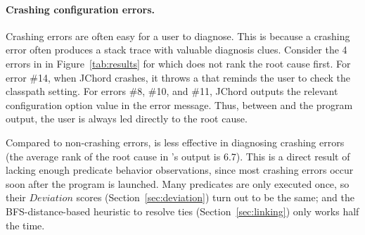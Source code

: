 
\paragraph{Crashing configuration errors.}

Crashing errors are often easy for a user to diagnose.
This is because a crashing error often produces a stack trace with valuable diagnosis clues.
Consider the 4 errors in in Figure~\ref{tab:results} for which \ourtool
does not rank the root cause first.
For error \#14, when JChord crashes, it throws a 
that reminds the user to check the classpath setting.  For errors \#8,
\#10, and \#11, 
JChord outputs the relevant configuration option value in the
error message.  Thus, between \ourtool and the program output, the user is
always led directly to the root cause.

Compared to non-crashing errors, \ourtool is less effective
in diagnosing crashing errors (the average rank of the root cause
in \ourtool's output is 6.7).
This is a direct result of lacking enough predicate behavior observations,
since most crashing errors occur soon
after the program is launched.  Many predicates are
only executed once, so their $Deviation$ scores
 (Section~\ref{sec:deviation}) turn out to be the same; and the
 BFS-distance-based heuristic to resolve ties (Section~\ref{sec:linking}) only
works half the time.














